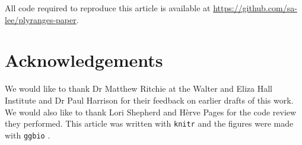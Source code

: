 \documentclass[]{article}
\begin{document}
All code required to reproduce this article is available at
\url{https://github.com/sa-lee/plyranges-paper}.

\section{Acknowledgements}\label{acknowledgements}

We would like to thank Dr Matthew Ritchie at the Walter and Eliza Hall
Institute and Dr Paul Harrison for their feedback on earlier drafts of
this work. We would also like to thank Lori Shepherd and Hèrve Pages for
the code review they performed. This article was written with
\texttt{knitr} \cite{R-knitr} and the figures were made with
\texttt{ggbio} \cite{R-ggbio}.




\newpage
\singlespacing 
\printbibliography[title=References]
\end{document}
